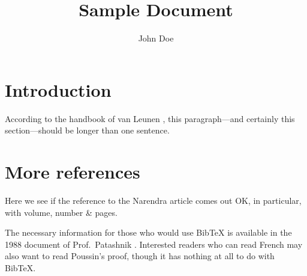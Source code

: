 \documentclass[11pt]{article}
\author{John Doe} \title{Sample Document}
\begin{document}
\maketitle

\section{Introduction}

According to the handbook of van Leunen \cite{vanleunen},
this paragraph---and certainly this
section---should be longer than one sentence.



\section{More references}

Here we see if the reference \cite{Narendra_1990}
to the Narendra article comes out OK, in particular,
with volume, number \& pages.

The necessary information for those who would use BibTeX
is available in the 1988 document of Prof.\ Patashnik \cite{btxdoc}.
Interested readers who can read French may also
want to read Poussin's proof\cite{primes}, though
it has nothing at all to do with BibTeX.



\end{document}
